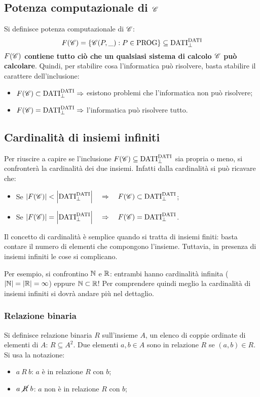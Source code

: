 \subsection{Potenza computazionale di \texorpdfstring{$\mathcal{C}$}{C}
\label{sec:pot_comp}}
Si definisce potenza computazionale di $\mathcal{C}$:
$$ F(\mathcal{C}) = \{\mathcal{C}(P,\_):P\in\text{PROG}\} \subseteq \text{DATI}^{\text{DATI}}_\perp $$
\textbf{$F(\mathcal{C})$ contiene tutto ciò che un qualsiasi sistema di calcolo $\mathcal{C}$
può calcolare}. Quindi, per stabilire cosa l'informatica può risolvere, basta stabilire
il carattere dell'inclusione:
\begin{itemize}
    \item $F(\mathcal{C})\subset\text{DATI}^{\text{DATI}}_\perp \Rightarrow $
        esistono problemi che l'informatica non può risolvere;
    \item $F(\mathcal{C})=\text{DATI}^{\text{DATI}}_\perp \Rightarrow $
        l'informatica può risolvere tutto.
\end{itemize}

\subsection{Cardinalità di insiemi infiniti}
Per riuscire a capire se l'inclusione
$F(\mathcal{C})\subseteq\text{DATI}^{\text{DATI}}_\perp$ sia propria o meno, si confronterà
la cardinalità dei due insiemi. Infatti dalla cardinalità si può ricavare che:
\begin{itemize}
    \item Se $|F(\mathcal{C})|<\left|\text{DATI}^{\text{DATI}}_\perp\right|
    \quad \Rightarrow \quad F(\mathcal{C})\subset\text{DATI}^{\text{DATI}}_\perp$;
    \item Se $|F(\mathcal{C})|=\left|\text{DATI}^{\text{DATI}}_\perp\right|
    \quad \Rightarrow \quad F(\mathcal{C})=\text{DATI}^{\text{DATI}}_\perp$.
\end{itemize}

Il concetto di cardinalità è semplice quando si tratta di insiemi finiti: basta
contare il numero di elementi che compongono l'insieme. Tuttavia, in presenza
di insiemi infiniti le cose si complicano.

Per esempio, si confrontino $\mathbb{N}$ e $\mathbb{R}$: entrambi hanno cardinalità infinita
($|\mathbb{N}|=|\mathbb{R}|=\infty$) eppure $\mathbb{N}\subset\mathbb{R}$! Per comprendere quindi meglio
la cardinalità di insiemi infiniti si dovrà andare più nel dettaglio.

\subsubsection{Relazione binaria}
Si definisce relazione binaria $R$ sull'insieme $A$, un elenco di coppie ordinate
di elementi di $A$: $R\subseteq A^2$. Due elementi $a,b\in A$ sono in relazione 
$R$ se $(a,b)\in R$. Si usa la notazione:
\begin{itemize}
    \item $a \ R \ b$: $a$ è in relazione $R$ con $b$;
    \item $a\ \cancel{R} \ b$: $a$ non è in relazione $R$ con $b$;
\end{itemize}

